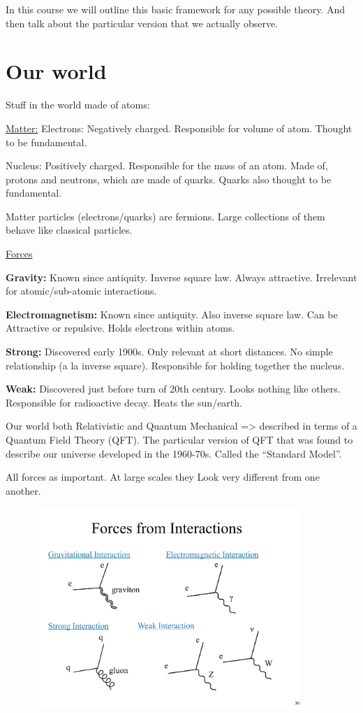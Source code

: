 {In this course we will outline this basic framework for any possible theory.
And then talk about the particular version that we actually observe.


\section{Our world}

Stuff in the world made of atoms:

\underline{Matter:}
Electrons: Negatively charged. 
Responsible for volume of atom.
Thought to be fundamental.

Nucleus: Positively charged.
Responsible for the mass of an atom.
Made of, protons and neutrons, which are made of quarks.
Quarks also thought to be fundamental.

Matter particles (electrons/quarks) are fermions.
Large collections of them behave like classical particles.

\underline{Forces}

\textbf{Gravity:}
Known since antiquity. 
Inverse square law.
Always attractive. 
Irrelevant for atomic/sub-atomic interactions.

\textbf{Electromagnetism:}
Known since antiquity.
Also inverse square law.
Can be Attractive or repulsive.
Holds electrons within atoms.

\textbf{Strong:}
Discovered early 1900s.
Only relevant at short distances.
No simple relationship (a la inverse square).
Responsible for holding together the nucleus.

\textbf{Weak:}
Discovered just before turn of 20th century.
Looks nothing like others.
Responsible for radioactive decay. 
Heats the sun/earth.

Our world both Relativistic and Quantum Mechanical => described in terms of a Quantum Field Theory (QFT).
The particular version of QFT that was found to describe our universe developed in the 1960-70s.
Called the ``Standard Model''.

All forces as important.
At large scales they Look very different from one another.

\begin{figure}[h]
\centering
\includegraphics[width=0.9\textwidth]{./Forces.pdf}
\end{figure}

}
